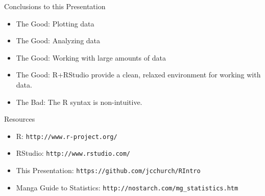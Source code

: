 \documentclass{beamer}
\begin{document}
\begin{frame}{Conclusions to this Presentation}

\begin{itemize}
\item The Good: Plotting data
\item The Good: Analyzing data
\item The Good: Working with large amounts of data
\item The Good: R+RStudio provide a clean, relaxed environment for working with data.
\item The Bad: The R syntax is non-intuitive.
\end{itemize}

\end{frame}

\begin{frame}{Resources}

\begin{itemize}
\item R: \verb+http://www.r-project.org/+
\item RStudio: \verb+http://www.rstudio.com/+
\item This Presentation: \verb+https://github.com/jcchurch/RIntro+
\item Manga Guide to Statistics: \verb+http://nostarch.com/mg_statistics.htm+
\end{itemize}

\end{frame}
\end{document}
